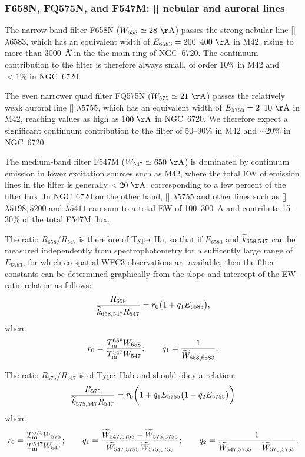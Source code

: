 \documentclass[preprint, 10pt]{aastex}
\newcommand\nii{[\ion{N}{2}]}
\newcommand\Wav[1]{\ensuremath{\lambda #1}}
\begin{document}
\subsubsection{F658N, FQ575N, and F547M: \nii{} nebular and auroral lines}
\label{sec:658-575-547}

The narrow-band filter F658N (\(W_{658} \simeq 28~\U{\AA}\)) passes
the strong nebular line \nii{} \Wav{6583}, which has an equivalent
width of \(E_{6583} = 200\textrm{--}400~\U{\AA}\) in M42, rising to
more than 3000~\U{\AA} in the the main ring of NGC~6720.
The continuum contribution to the filter is therefore always small, of
order 10\% in M42 and \(< 1\%\) in NGC~6720.

The even narrower quad filter FQ575N (\(W_{575} \simeq 21~\U{\AA}\))
passes the relatively weak auroral line \nii{} \Wav{5755}, which has
an equivalent width of \(E_{5755} = 2\textrm{--}10~\U{\AA}\) in M42,
reaching values as high as \(100~\U{\AA}\) in NGC~6720.  We therefore
expect a significant continuum contribution to the filter of 50--90\%
in M42 and \(\sim 20\%\) in NGC~6720.

The medium-band filter F547M (\(W_{547} \simeq 650~\U{\AA}\)) is
dominated by continuum emission in lower excitation sources such as
M42, where the total EW of emission lines in the filter is generally
\(< 20~\U{\AA}\), corresponding to a few percent of the filter flux.
In NGC~6720 on the other hand, \nii{} \Wav{5755} and other lines such
as [] \Wav{5198,5200} and  \Wav{5411} can sum to
a total EW of 100--300~\AA{} and contribute 15--30\% of the total
F547M flux.

The ratio \(R_{658} / R_{547}\) is therefore of Type~IIa, so that if
\(E_{6583}\) and \(\widetilde{k}_{658, 547}\) can be measured independently
from spectrophotometry for a sufficently large range of \(E_{6583}\),
for which co-spatial WFC3 observations are available, then the filter constants can be determined graphically from the slope and
intercept of the EW--ratio relation as follows:
\begin{equation}
  \label{eq:658-547}
  \frac{R_{658}}{\widetilde{k}_{658, 547} R_{547}} = 
  r_0 \bigl( 
  1 + q_1 E_{6583}  
  \bigr) , 
\end{equation}
where
\[
r_0 = \frac{T_{\mathrm{m}}^{658} W_{658}}{T_{\mathrm{m}}^{547} W_{547}} ;
\quad\quad
q_1 = \frac{1}{\widetilde{W}_{658, 6583}} .
\]

The ratio \(R_{575} / R_{547}\) is of Type~IIab and should obey a relation:
\begin{equation}
  \label{eq:575-547}
  \frac{R_{575}}{\widetilde{k}_{575, 547} R_{547}} = 
  r_0 \biggl( 
    1 + q_1 E_{5755} \bigl( 
      1 - q_2 E_{5755}
    \bigr)
  \biggr)
\end{equation}
where
\[
r_0 = \frac{T_{\mathrm{m}}^{575} W_{575}}{T_{\mathrm{m}}^{547} W_{547}} ;
\quad\quad
q_1 = \frac{\widetilde{W}_{547, 5755} - \widetilde{W}_{575, 5755}}{\widetilde{W}_{547, 5755} \, \widetilde{W}_{575, 5755}} ;
\quad\quad
q_2 = \frac{1}{\widetilde{W}_{547, 5755} - \widetilde{W}_{575, 5755}} .
\]
\end{document}
